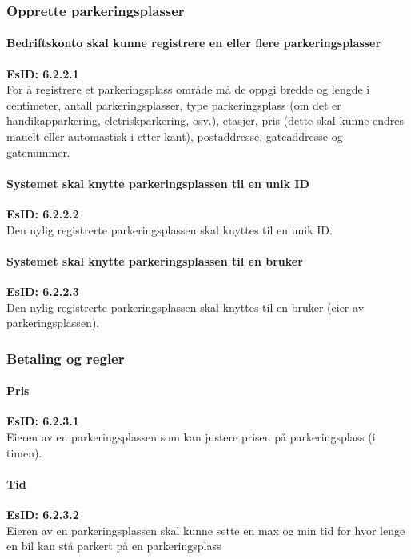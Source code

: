 \documentclass[12pt]{article}
\begin{document}
        \subsubsection{Opprette parkeringsplasser}

            \paragraph{Bedriftskonto skal kunne registrere en eller flere parkeringsplasser}
            \textbf{EsID: 6.2.2.1}\\For å registrere et parkeringsplass område må de oppgi bredde og lengde i centimeter, antall parkeringsplasser, type parkeringsplass (om det er handikapparkering, eletriskparkering, osv.), etasjer, pris (dette skal kunne endres mauelt eller automastisk i etter kant), postaddresse, gateaddresse og gatenummer.

            \paragraph{Systemet skal knytte parkeringsplassen til en unik ID}
            \textbf{EsID: 6.2.2.2}\\Den nylig registrerte parkeringsplassen skal knyttes til en unik ID.

            \paragraph{Systemet skal knytte parkeringsplassen til en bruker}
            \textbf{EsID: 6.2.2.3}\\Den nylig registrerte parkeringsplassen skal knyttes til en bruker (eier av parkeringsplassen).

        \subsubsection{Betaling og regler}

            \paragraph{Pris}
            \textbf{EsID: 6.2.3.1}\\Eieren av en parkeringsplassen som kan justere prisen på parkeringsplass (i timen).

            \paragraph{Tid}
            \textbf{EsID: 6.2.3.2}\\Eieren av en parkeringsplassen skal kunne sette en max og min tid for hvor lenge en bil kan stå parkert på en parkeringsplass
\end{document}
